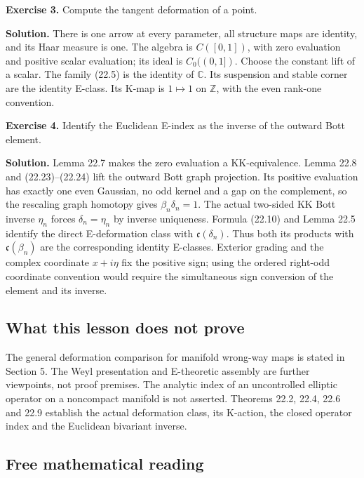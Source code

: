 \documentclass[
  11pt,
]{article}
\begin{document}
\textbf{Exercise 3.} Compute the tangent deformation of a point.

\textbf{Solution.} There is one arrow at every parameter, all structure
maps are identity, and its Haar measure is one. The algebra is
\(C([0,1])\), with zero evaluation and positive scalar evaluation; its
ideal is \(C_0((0,1])\). Choose the constant lift of a scalar. The
family (22.5) is the identity of \(\mathbb C\). Its suspension and
stable corner are the identity E-class. Its K-map is \(1\mapsto1\) on
\(\mathbb Z\), with the even rank-one convention.

\textbf{Exercise 4.} Identify the Euclidean E-index as the inverse of
the outward Bott element.

\textbf{Solution.} Lemma 22.7 makes the zero evaluation a
KK-equivalence. Lemma 22.8 and (22.23)--(22.24) lift the outward Bott
graph projection. Its positive evaluation has exactly one even Gaussian,
no odd kernel and a gap on the complement, so the rescaling graph
homotopy gives \(\beta_n\delta_n=1\). The actual two-sided KK Bott
inverse \(\eta_n\) forces \(\delta_n=\eta_n\) by inverse uniqueness.
Formula (22.10) and Lemma 22.5 identify the direct E-deformation class
with \(\mathfrak c(\delta_n)\). Thus both its products with
\(\mathfrak c(\beta_n)\) are the corresponding identity E-classes.
Exterior grading and the complex coordinate \(x+i\eta\) fix the positive
sign; using the ordered right-odd coordinate convention would require
the simultaneous sign conversion of the element and its inverse.

\subsection{What this lesson does not
prove}\label{what-this-lesson-does-not-prove}

The general deformation comparison for manifold wrong-way maps is stated
in Section 5. The Weyl presentation and E-theoretic assembly are further
viewpoints, not proof premises. The analytic index of an uncontrolled
elliptic operator on a noncompact manifold is not asserted. Theorems
22.2, 22.4, 22.6 and 22.9 establish the actual deformation class, its
K-action, the closed operator index and the Euclidean bivariant inverse.

\subsection{Free mathematical reading}\label{free-mathematical-reading}
\end{document}
